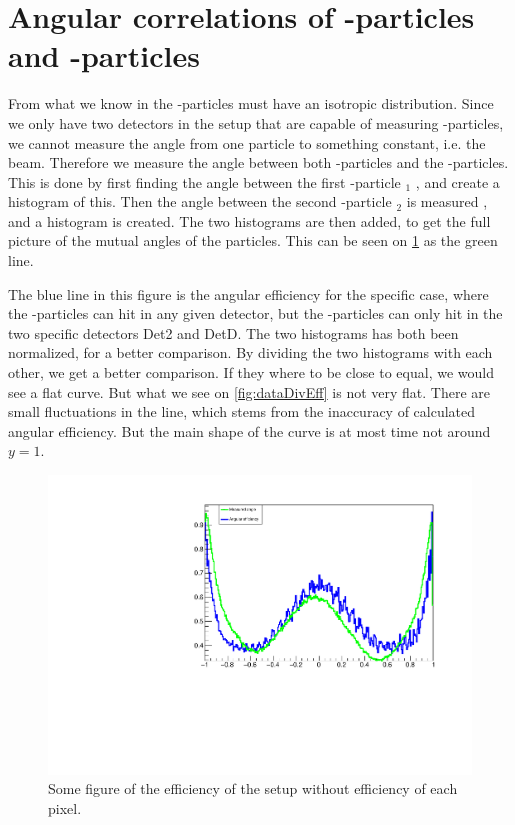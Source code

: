 \section{Angular correlations of \al-particles and \be-particles}
\label{sec:betaAngle}
From what we know in  the \be-particles must have an isotropic distribution. Since we only have two detectors in the setup that are capable of measuring \be-particles, we cannot measure the angle from one particle to something constant, i.e. the beam. Therefore we measure the angle between both \al-particles and the \be-particles.
This is done by first finding the angle between the first \al-particle \al$_1$ , and create a histogram of this. Then the angle between the second \al-particle \al$_2$ is measured , and a histogram is created. The two histograms are then added, to get the full picture of the mutual angles of the particles. 
This can be seen on \cref{fig:effwithweight} as the green line.  

The blue line in this figure is the angular efficiency for the specific case, where the \al-particles can hit in any given detector, but the \be-particles can only hit in the two specific detectors Det2 and DetD. The two histograms has both been normalized, for a better comparison. By dividing the two histograms with each other, we get a better comparison. If they where to be close to equal, we would see a flat curve. But what we see on \cref{fig:dataDivEff} is not very flat. 
There are small fluctuations in the line, which stems from the inaccuracy of calculated angular efficiency. But the main shape of the curve is at most time not around $y=1$.

\begin{figure}[h]
	\centering
	\includegraphics[width=\linewidth]{../figures/betaAngles/betaAngle.pdf}
	\caption{Some figure of the efficiency of the setup without efficiency of each pixel. }
	\label{fig:effwithweight}
\end{figure}

